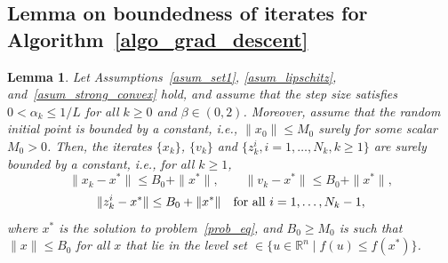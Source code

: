 \documentclass{article}
\def\a{\alpha}
\def\rn{\mathbb{R}^n}
\theoremstyle{plain}
\newtheorem{lemma}[theorem]{Lemma}
\theoremstyle{definition}
\theoremstyle{remark}
\begin{document}
\subsection{Lemma on boundedness of iterates for Algorithm~\ref{algo_grad_descent}}\label{lem-bounded-iterates-proof}
%
%
\begin{lemma}\label{lem-bounded-iterates}
Let Assumptions~\ref{asum_set1}, \ref{asum_lipschitz}, and~\ref{asum_strong_convex} hold,
and assume that the step size satisfies $0<\a_k \le 1/L$ for all $k\ge0$ and $\beta \in(0,2)$.
Moreover, assume that the random initial point is bounded by a constant, i.e., $\|x_0\|\le M_0$ surely for some scalar $M_0>0$.
Then, the iterates $\{x_k\}$, $\{v_k\}$ and $\{z_k^i, i=1,\ldots,N_k, k\ge1\}$ are surely bounded by a constant, i.e., for all $k \geq 1$,
\[\|x_k-x^*\|\le B_0+\|x^*\|, \qquad \|v_k-x^*\|\le B_0+\|x^*\|,\]
\[\|z_{k}^i-x^*\|\le B_0+\|x^*\| \quad \hbox{for all $i=1,\ldots,N_k-1$},\]
where $x^*$ is the solution to problem~\eqref{prob_eq}, and $B_0\ge M_0$ is such that
$\|x\|\le B_0$ for all $x$ that lie in the level set $\in\{u\in\rn \mid f(u)\le f(x^*)\}$.
\end{lemma}
%
%
\end{document}

